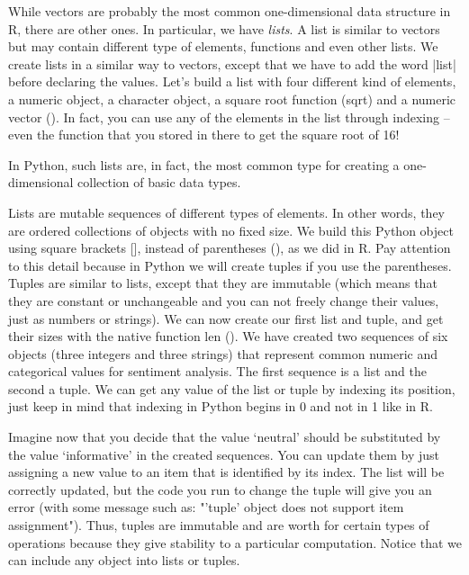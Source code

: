 


While vectors are probably the most common one-dimensional data
structure in R, there are other ones. In particular, we have
\emph{lists}. A list is similar to vectors but may contain different
type of elements, functions and even other lists. We create lists in a
similar way to vectors, except that we have to add the word |list|
before declaring the values. Let's build a list with four different
kind of elements, a numeric object, a character object, a square root
function (sqrt) and a numeric vector (). In fact, you
can use any of the elements in the list through indexing -- even the
function  that you stored in there to get the square root of
16!




In Python, such lists are, in fact, the most common type for creating
a one-dimensional collection of basic data types. 

Lists are mutable sequences of different types of elements. In other
words, they are ordered collections of objects with no fixed size. We
build this Python object using square brackets [], instead of
parentheses (), as we did in R. Pay attention to this detail because
in Python we will create tuples if you use the parentheses. Tuples are
similar to lists, except that they are immutable (which means that
they are constant or unchangeable and you can not freely change their
values, just as numbers or strings).  We can now create our first list
and tuple, and get their sizes with the native function len
(). We have created two sequences of six objects
(three integers and three strings) that represent common numeric and
categorical values for sentiment analysis. The first sequence is a
list and the second a tuple. We can get any value of the list or tuple
by indexing its position, just keep in mind that indexing in Python
begins in 0 and not in 1 like in R.


Imagine now that you decide that the value `neutral' should be
substituted by the value `informative' in the created sequences. You
can update them by just assigning a new value to an item that is
identified by its index.  The list will be correctly updated, but the
code you run to change the tuple will give you an error (with some
message such as: "'tuple' object does not support item
assignment"). Thus, tuples are immutable and are worth for certain
types of operations because they give stability to a particular
computation. Notice that we can include any object into lists or
tuples.


